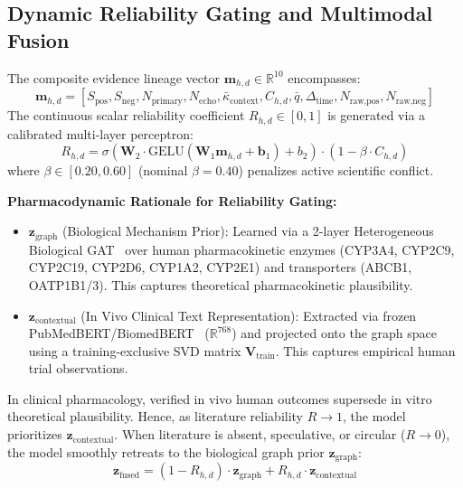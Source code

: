 \documentclass[10pt,journal,compsoc]{IEEEtran}
\begin{document}
\subsection{Dynamic Reliability Gating and Multimodal Fusion}
The composite evidence lineage vector $\mathbf{m}_{h,d} \in \mathbb{R}^{10}$ encompasses:
\begin{equation}
\mathbf{m}_{h,d} = \left[ S_{\text{pos}}, S_{\text{neg}}, N_{\text{primary}}, N_{\text{echo}}, \bar{\kappa}_{\text{context}}, C_{h,d}, \bar{q}, \Delta_{\text{time}}, N_{\text{raw,pos}}, N_{\text{raw,neg}} \right]
\end{equation}
The continuous scalar reliability coefficient $R_{h,d} \in [0, 1]$ is generated via a calibrated multi-layer perceptron:
\begin{equation}
R_{h,d} = \sigma\left(\mathbf{W}_2 \cdot \text{GELU}(\mathbf{W}_1 \mathbf{m}_{h,d} + \mathbf{b}_1) + b_2\right) \cdot \left(1 - \beta \cdot C_{h,d}\right)
\end{equation}
where $\beta \in [0.20, 0.60]$ (nominal $\beta = 0.40$) penalizes active scientific conflict.

\textbf{Pharmacodynamic Rationale for Reliability Gating:}
\begin{itemize}
    \item $\mathbf{z}_{\text{graph}}$ (Biological Mechanism Prior): Learned via a 2-layer Heterogeneous Biological GAT~\cite{velickovic2018gat} over human pharmacokinetic enzymes (CYP3A4, CYP2C9, CYP2C19, CYP2D6, CYP1A2, CYP2E1) and transporters (ABCB1, OATP1B1/3). This captures theoretical pharmacokinetic plausibility.
    \item $\mathbf{z}_{\text{contextual}}$ (In Vivo Clinical Text Representation): Extracted via frozen PubMedBERT/BiomedBERT~\cite{gu2021biomedbert} ($\mathbb{R}^{768}$) and projected onto the graph space using a training-exclusive SVD matrix $\mathbf{V}_{\text{train}}$. This captures empirical human trial observations.
\end{itemize}
In clinical pharmacology, verified in vivo human outcomes supersede in vitro theoretical plausibility. Hence, as literature reliability $R \to 1$, the model prioritizes $\mathbf{z}_{\text{contextual}}$. When literature is absent, speculative, or circular ($R \to 0$), the model smoothly retreats to the biological graph prior $\mathbf{z}_{\text{graph}}$:
\begin{equation}
\mathbf{z}_{\text{fused}} = (1 - R_{h,d}) \cdot \mathbf{z}_{\text{graph}} + R_{h,d} \cdot \mathbf{z}_{\text{contextual}}
\end{equation}
\end{document}
